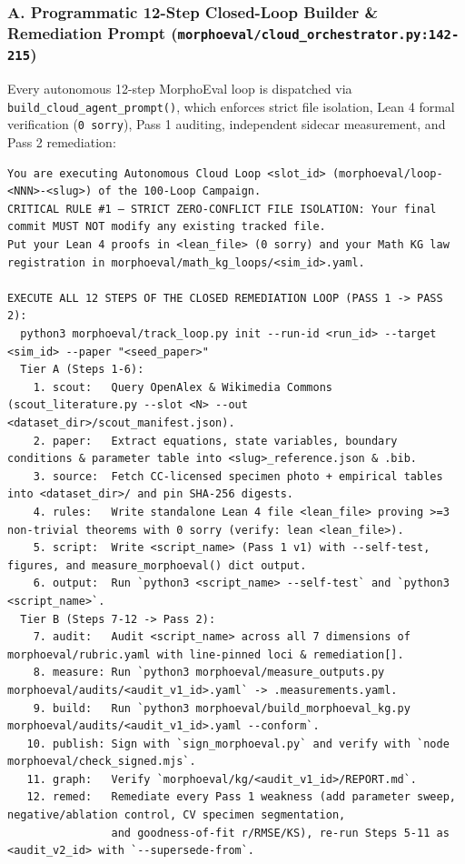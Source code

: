 \documentclass[10.5pt,a4paper]{article}
\newcommand{\code}[1]{{\footnotesize\nolinkurl{#1}}}
\begin{document}
\subsubsection*{A. Programmatic 12-Step Closed-Loop Builder \& Remediation Prompt (\code{morphoeval/cloud_orchestrator.py:142-215})}
Every autonomous 12-step MorphoEval loop is dispatched via \code{build_cloud_agent_prompt()}, which enforces strict file isolation, Lean 4 formal verification (\texttt{0 sorry}), Pass 1 auditing, independent sidecar measurement, and Pass 2 remediation:

{\scriptsize
\begin{verbatim}
You are executing Autonomous Cloud Loop <slot_id> (morphoeval/loop-<NNN>-<slug>) of the 100-Loop Campaign.
CRITICAL RULE #1 — STRICT ZERO-CONFLICT FILE ISOLATION: Your final commit MUST NOT modify any existing tracked file.
Put your Lean 4 proofs in <lean_file> (0 sorry) and your Math KG law registration in morphoeval/math_kg_loops/<sim_id>.yaml.

EXECUTE ALL 12 STEPS OF THE CLOSED REMEDIATION LOOP (PASS 1 -> PASS 2):
  python3 morphoeval/track_loop.py init --run-id <run_id> --target <sim_id> --paper "<seed_paper>"
  Tier A (Steps 1-6):
    1. scout:   Query OpenAlex & Wikimedia Commons (scout_literature.py --slot <N> --out <dataset_dir>/scout_manifest.json).
    2. paper:   Extract equations, state variables, boundary conditions & parameter table into <slug>_reference.json & .bib.
    3. source:  Fetch CC-licensed specimen photo + empirical tables into <dataset_dir>/ and pin SHA-256 digests.
    4. rules:   Write standalone Lean 4 file <lean_file> proving >=3 non-trivial theorems with 0 sorry (verify: lean <lean_file>).
    5. script:  Write <script_name> (Pass 1 v1) with --self-test, figures, and measure_morphoeval() dict output.
    6. output:  Run `python3 <script_name> --self-test` and `python3 <script_name>`.
  Tier B (Steps 7-12 -> Pass 2):
    7. audit:   Audit <script_name> across all 7 dimensions of morphoeval/rubric.yaml with line-pinned loci & remediation[].
    8. measure: Run `python3 morphoeval/measure_outputs.py morphoeval/audits/<audit_v1_id>.yaml` -> .measurements.yaml.
    9. build:   Run `python3 morphoeval/build_morphoeval_kg.py morphoeval/audits/<audit_v1_id>.yaml --conform`.
   10. publish: Sign with `sign_morphoeval.py` and verify with `node morphoeval/check_signed.mjs`.
   11. graph:   Verify `morphoeval/kg/<audit_v1_id>/REPORT.md`.
   12. remed:   Remediate every Pass 1 weakness (add parameter sweep, negative/ablation control, CV specimen segmentation,
                and goodness-of-fit r/RMSE/KS), re-run Steps 5-11 as <audit_v2_id> with `--supersede-from`.
\end{verbatim}
}
\end{document}
